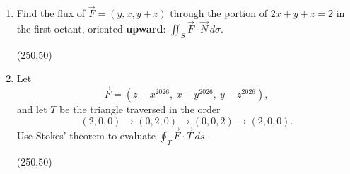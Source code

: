 \documentclass[12pt]{exam}
\begin{document}
\begin{enumerate}
\newpage

\item Find the flux of $\vec F=(y,x,y+z)$ through the portion of
$2x+y+z=2$ in the first octant, oriented \textbf{upward}: \(\iint_S\vec F\cdot\vec N\,d\sigma\).

\vfill
\begin{flushright}
\framebox(250,50){}
\end{flushright}

\item Let
\[
\vec F=(z-x^{2026},\ x-y^{2026},\ y-z^{2026}),
\]
and let $T$ be the triangle traversed in the order
\[
(2,0,0)\longrightarrow(0,2,0)\longrightarrow(0,0,2)
\longrightarrow(2,0,0).
\]
Use Stokes' theorem to evaluate
$\displaystyle\oint_T\vec F\cdot\vec T\,ds$.

\vfill
\begin{flushright}
\framebox(250,50){}
\end{flushright}

\end{enumerate}
\end{document}
